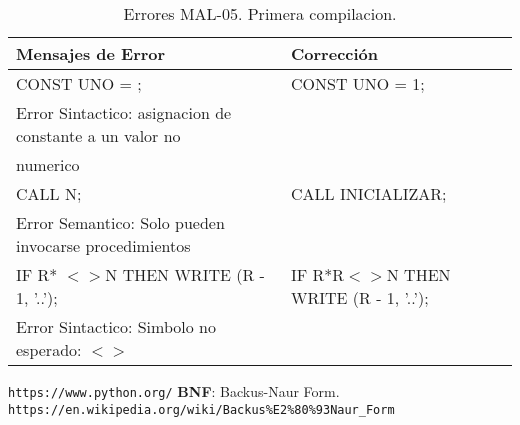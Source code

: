 \documentclass[a4paper,12pt]{article}
\begin{document}
\begin{table}[h!]
\centering
\begin{tabular}{|l|l|}
\hline
Mensajes de Error & Corrección\\
\hline
CONST UNO = ;												& CONST UNO = 1;\\
Error Sintactico: asignacion de constante a un valor no 		&\\
numerico														&\\
\hline
CALL N;														& CALL INICIALIZAR;\\
Error Semantico: Solo pueden invocarse procedimientos		&\\
\hline
IF R* $<>$N THEN WRITE (R - 1, '..');						& IF R*R$<>$N THEN WRITE (R - 1, '..');\\
Error Sintactico: Simbolo no esperado: $<>$					&\\
\hline
\end{tabular}
\caption{Errores MAL-05. Primera compilacion.}
\label{MAL-05-1}
\end{table}


\begin{thebibliography}{10}
 \texttt{https://www.python.org/}
 \textbf{BNF}: Backus-Naur Form. \texttt{https://en.wikipedia.org/wiki/Backus\%E2\%80\%93Naur\_Form}
\end{thebibliography}
\end{document}
